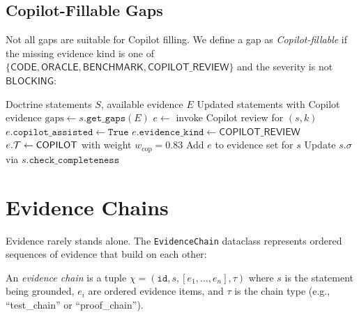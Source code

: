 \documentclass[11pt]{article}
\newcommand{\CopRev}{\mathsf{COPILOT\_REVIEW}}
\newcommand{\copweight}{w_{\mathrm{cop}}}
\begin{document}
\subsection{Copilot-Fillable Gaps}

Not all gaps are suitable for Copilot filling.  We define a gap as
\emph{Copilot-fillable} if the missing evidence kind is one of
$\{\mathsf{CODE}, \mathsf{ORACLE}, \mathsf{BENCHMARK}, \CopRev\}$ and the
severity is not $\mathsf{BLOCKING}$:

\begin{algorithm}[h]
\caption{Copilot Gap Filling}
\label{alg:gap-fill}
\begin{algorithmic}[1]
\REQUIRE Doctrine statements $S$, available evidence $E$
\ENSURE Updated statements with Copilot evidence
  \STATE $\mathrm{gaps} \gets s.\texttt{get\_gaps}(E)$
      \STATE $e \gets$ invoke Copilot review for $(s, k)$
      \STATE $e.\texttt{copilot\_assisted} \gets \texttt{True}$
      \STATE $e.\texttt{evidence\_kind} \gets \CopRev$
      \STATE $e.\mathcal{T} \gets \mathsf{COPILOT}$ with weight $\copweight = 0.83$
      \STATE Add $e$ to evidence set for $s$
    \ENDIF
  \ENDFOR
  \STATE Update $s.\sigma$ via $s.\texttt{check\_completeness}$
\ENDFOR
\end{algorithmic}
\end{algorithm}

\section{Evidence Chains}\label{sec:chains}

Evidence rarely stands alone.  The \texttt{EvidenceChain} dataclass represents
ordered sequences of evidence that build on each other:

\begin{definition}\label{def:chain}
An \emph{evidence chain} is a tuple $\chi = (\texttt{id}, s, [e_1, \ldots,
e_n], \tau)$ where $s$ is the statement being grounded, $e_i$ are ordered
evidence items, and $\tau$ is the chain type (e.g., ``test\_chain'' or
``proof\_chain'').
\end{definition}
\end{document}
